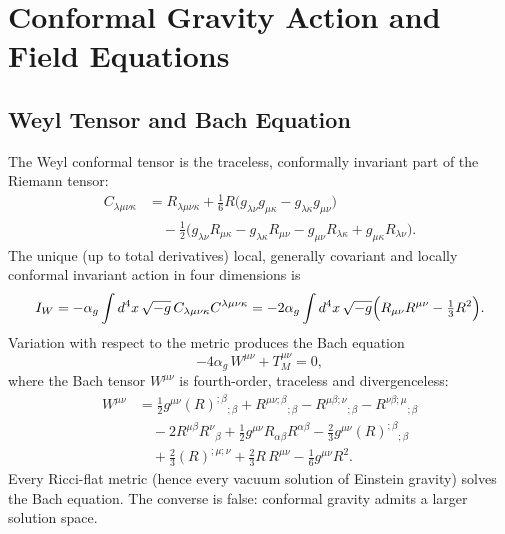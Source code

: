 \documentclass{article}
\begin{document}
\section{Conformal Gravity Action and Field Equations}
\label{sec:action}

\subsection{Weyl Tensor and Bach Equation}

The Weyl conformal tensor is the traceless, conformally invariant part of the Riemann tensor:
\begin{equation}
\begin{aligned}
C_{\lambda\mu\nu\kappa}
&= R_{\lambda\mu\nu\kappa}
+\tfrac16 R\bigl(g_{\lambda\nu}g_{\mu\kappa}-g_{\lambda\kappa}g_{\mu\nu}\bigr)\\
&\quad-\tfrac12\bigl(g_{\lambda\nu}R_{\mu\kappa}-g_{\lambda\kappa}R_{\mu\nu}
-g_{\mu\nu}R_{\lambda\kappa}+g_{\mu\kappa}R_{\lambda\nu}\bigr).
\end{aligned}
\end{equation}
The unique (up to total derivatives) local, generally covariant and locally conformal invariant action in four dimensions is
\begin{equation}
I_W=-\alpha_g\int d^4x\,\sqrt{-g}\,C_{\lambda\mu\nu\kappa}C^{\lambda\mu\nu\kappa}
=-2\alpha_g\int d^4x\,\sqrt{-g}\Bigl(R_{\mu\nu}R^{\mu\nu}-\tfrac13 R^2\Bigr).
\end{equation}
Variation with respect to the metric produces the Bach equation
\begin{equation}
-4\alpha_g\,W^{\mu\nu}+T_M^{\mu\nu}=0,
\end{equation}
where the Bach tensor \(W^{\mu\nu}\) is fourth-order, traceless and divergenceless:
\begin{equation}
\begin{aligned}
W^{\mu\nu}
&=\tfrac12 g^{\mu\nu}(R)^{;\beta}{}_{;\beta}+R^{\mu\nu;\beta}{}_{;\beta}
-R^{\mu\beta;\nu}{}_{;\beta}-R^{\nu\beta;\mu}{}_{;\beta}\\
&\quad-2R^{\mu\beta}R^\nu{}_\beta+\tfrac12 g^{\mu\nu}R_{\alpha\beta}R^{\alpha\beta}
-\tfrac23 g^{\mu\nu}(R)^{;\beta}{}_{;\beta}\\
&\quad+\tfrac23(R)^{;\mu;\nu}+\tfrac23 R\,R^{\mu\nu}-\tfrac16 g^{\mu\nu}R^2.
\end{aligned}
\end{equation}
Every Ricci-flat metric (hence every vacuum solution of Einstein gravity) solves the Bach equation. The converse is false: conformal gravity admits a larger solution space.
\end{document}
